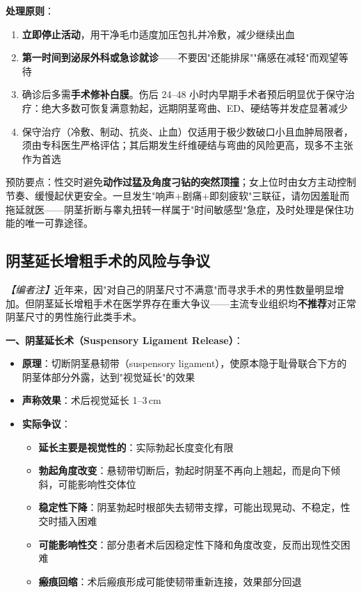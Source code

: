 \vspace{0.5em}
\noindent\textbf{处理原则}：
\begin{enumerate}
	\item \textbf{立即停止活动}，用干净毛巾适度加压包扎并冷敷，减少继续出血
	\item \textbf{第一时间到泌尿外科或急诊就诊}——不要因"还能排尿""痛感在减轻"而观望等待
	\item 确诊后多需\textbf{手术修补白膜}。伤后 24--48 小时内早期手术者预后明显优于保守治疗：绝大多数可恢复满意勃起，远期阴茎弯曲、ED、硬结等并发症显著减少
	\item 保守治疗（冷敷、制动、抗炎、止血）仅适用于极少数破口小且血肿局限者，须由专科医生严格评估；其后期发生纤维硬结与弯曲的风险更高，现多不主张作为首选
\end{enumerate}

\begin{tcolorbox}[colback=pink!5!white,colframe=red!50!black,title=贴心小叮咛]
预防要点：性交时避免\textbf{动作过猛及角度刁钻的突然顶撞}；女上位时由女方主动控制节奏、缓慢起伏更安全。一旦发生"响声+剧痛+即刻疲软"三联征，请勿因羞耻而拖延就医——阴茎折断与睾丸扭转一样属于"时间敏感型"急症，及时处理是保住功能的唯一可靠途径。
\end{tcolorbox}

\subsection{阴茎延长增粗手术的风险与争议}
\label{subsec:penile_enlargement}

\noindent\textit{【编者注】}近年来，因"对自己的阴茎尺寸不满意"而寻求手术的男性数量明显增加。但阴茎延长增粗手术在医学界存在重大争议——主流专业组织均\textbf{不推荐}对正常阴茎尺寸的男性施行此类手术。

\vspace{0.5em}
\noindent\textbf{一、阴茎延长术（Suspensory Ligament Release）}：

\begin{itemize}[leftmargin=2cm]
	\item \textbf{原理}：切断阴茎悬韧带（suspensory ligament），使原本隐于耻骨联合下方的阴茎体部分外露，达到"视觉延长"的效果
	\item \textbf{声称效果}：术后视觉延长 1--3\,cm
	\item \textbf{实际争议}：
	\begin{itemize}
		\item \textbf{延长主要是视觉性的}：实际勃起长度变化有限
		\item \textbf{勃起角度改变}：悬韧带切断后，勃起时阴茎不再向上翘起，而是向下倾斜，可能影响性交体位
		\item \textbf{稳定性下降}：阴茎勃起时根部失去韧带支撑，可能出现晃动、不稳定，性交时插入困难
		\item \textbf{可能影响性交}：部分患者术后因稳定性下降和角度改变，反而出现性交困难
		\item \textbf{瘢痕回缩}：术后瘢痕形成可能使韧带重新连接，效果部分回退
	\end{itemize}
\end{itemize}

